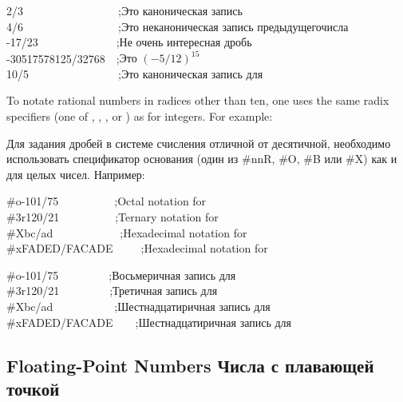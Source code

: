 {\begin{lisp}
2/3~~~~~~~~~~~~~~~~~;{\rm Это каноническая запись} \\
4/6~~~~~~~~~~~~~~~~~;{\rm Это неканоническая запись предыдущегочисла} \\
-17/23~~~~~~~~~~~~~~;{\rm Не очень интересная дробь} \\
-30517578125/32768~~;{\rm Это \((-5/12)^{15}\)} \\
10/5~~~~~~~~~~~~~~~~;{\rm Это каноническая запись для }
\end{lisp}

To notate rational numbers in radices other than ten,
one uses the same radix specifiers
(one of , , , or ) as for integers.
For example:

Для задания дробей в системе счисления отличной от десятичной, необходимо использовать спецификатор основания (один из #nnR, #O, #B или #X) как и для целых чисел. Например:
\begin{lisp}
\#o-101/75~~~~~~~~~~;{\rm Octal notation for } \\
\#3r120/21~~~~~~~~~~;{\rm Ternary notation for } \\
\#Xbc/ad~~~~~~~~~~~~;{\rm Hexadecimal notation for } \\
\#xFADED/FACADE~~~~~;{\rm Hexadecimal notation for }
\end{lisp}

\begin{lisp}
\#o-101/75~~~~~~~~~;{\rm Восьмеричная запись для } \\
\#3r120/21~~~~~~~~~;{\rm Третичная запись для } \\
\#Xbc/ad~~~~~~~~~~~;{\rm Шестнадцатиричная запись для } \\
\#xFADED/FACADE~~~~;{\rm Шестнадцатиричная запись для } 
\end{lisp}

\subsection{Floating-Point Numbers Числа с плавающей точкой}

}
